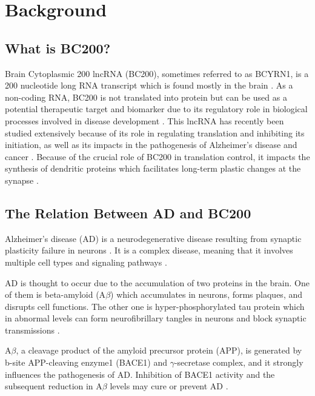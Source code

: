 \documentclass[conference, 11pt]{IEEEtran}
\begin{document}
\section{Background}\label{sec:background}

\subsection{What is BC200?}

Brain Cytoplasmic 200 lncRNA (BC200), sometimes referred to as BCYRN1, is a 200 nucleotide long RNA transcript which is found mostly in the brain \cite{tiedge1993primary}. 
As a non-coding RNA, BC200 is not translated into protein but can be used as a potential therapeutic target and biomarker due to its regulatory role in biological processes involved in disease development \cite{zhang2021role,mus2007dendritic}. 
This lncRNA has recently been studied extensively because of its role in regulating translation and inhibiting its initiation, as well as its impacts in the pathogenesis of Alzheimer's disease and cancer \cite{zhang2021role,tiedge1993primary}. 
Because of the crucial role of BC200 in translation control, it impacts the synthesis of dendritic proteins which facilitates long-term plastic changes at the synapse \cite{mus2007dendritic}.

\subsection{The Relation Between AD and BC200}

Alzheimer's disease (AD) is a neurodegenerative disease resulting from synaptic plasticity failure in neurons \cite{mus2007dendritic}. 
It is a complex disease, meaning that it involves multiple cell types and signaling pathways \cite{zhang2021role}.

AD is thought to occur due to the accumulation of two proteins in the brain. 
One of them is beta-amyloid (A$\beta$) which accumulates in neurons, forms plaques, and disrupts cell functions. 
The other one is hyper-phosphorylated tau protein which in abnormal levels can form neurofibrillary tangles in neurons and block synaptic transmissions \cite{zhang2021role}.

A$\beta$, a cleavage product of the amyloid precursor protein (APP), is generated by b-site APP-cleaving enzyme1 (BACE1) and $\gamma$-secretase complex, and it strongly influences the pathogenesis of AD. 
Inhibition of BACE1 activity and the subsequent reduction in A$\beta$ levels may cure or prevent AD \cite{li2018identification,zhang2021role}.
\end{document}

